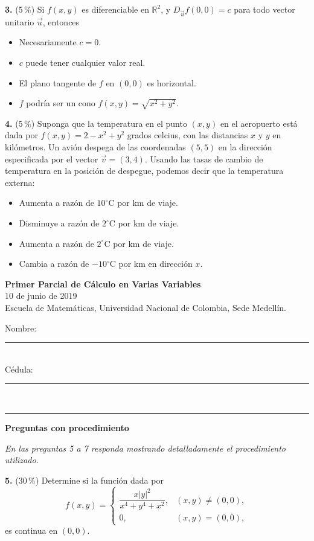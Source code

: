 \documentclass[11pt]{article}
\newcommand{\examheader}{%
  \noindent
  \begin{minipage}[t]{0.62\linewidth}
    {\bfseries\large Primer Parcial de C\'alculo en Varias Variables}\\
    {\small 10 de junio de 2019}\\
    {\small Escuela de Matem\'aticas, Universidad Nacional de Colombia, Sede Medell\'in.}
  \end{minipage}%
  \hfill
  \begin{minipage}[t]{0.33\linewidth}
    \raggedleft\small
    Nombre: \rule{2.8cm}{0.4pt}\\[4pt]
    C\'edula: \rule{2.8cm}{0.4pt}
  \end{minipage}\\[4pt]
  \rule{\linewidth}{0.6pt}
}
\begin{document}
\bigskip
\noindent\textbf{3.} (5\,\%) Si $f(x,y)$ es diferenciable en $\mathbb{R}^2$, y $D_{\vec u}f(0,0)=c$ para todo vector unitario $\vec u$, entonces

\begin{itemize}[itemsep=1pt,topsep=2pt,leftmargin=1.8em]
  \item[$\square$] Necesariamente $c=0$.
  \item[$\square$] $c$ puede tener cualquier valor real.
  \item[$\square$] El plano tangente de $f$ en $(0,0)$ es horizontal.
  \item[$\square$] $f$ podr\'ia ser un cono $f(x,y)=\sqrt{x^2+y^2}$.
\end{itemize}

\bigskip
\noindent\textbf{4.} (5\,\%) Suponga que la temperatura en el punto $(x,y)$ en el aeropuerto est\'a dada por $f(x,y)=2-x^2+y^2$ grados celcius, con las distancias $x$ y $y$ en kil\'ometros. Un avi\'on despega de las coordenadas $(5,5)$ en la direcci\'on especificada por el vector $\vec v=(3,4)$. Usando las tasas de cambio de temperatura en la posici\'on de despegue, podemos decir que la temperatura externa:

\vspace{-2pt}
\begin{itemize}[itemsep=0pt,topsep=1pt,leftmargin=1.8em]
  \item[$\square$] Aumenta a raz\'on de $10^{\circ}$C por km de viaje.
  \item[$\square$] Disminuye a raz\'on de $2^{\circ}$C por km de viaje.
  \item[$\square$] Aumenta a raz\'on de $2^{\circ}$C por km de viaje.
  \item[$\square$] Cambia a raz\'on de $-10^{\circ}$C por km en direcci\'on $x$.
\end{itemize}

\newpage
\examheader
\vspace{2pt}

\textbf{Preguntas con procedimiento}

\textit{En las preguntas 5 a 7 responda mostrando detalladamente el procedimiento utilizado.}

\bigskip
\noindent\textbf{5.} (30\,\%) Determine si la funci\'on dada por
$$
f(x,y)=
\begin{cases}
\dfrac{x|y|^2}{x^4+y^4+x^2}, & (x,y)\neq (0,0),\\[6pt]
0, & (x,y)=(0,0),
\end{cases}
$$
es continua en $(0,0)$.
\end{document}

